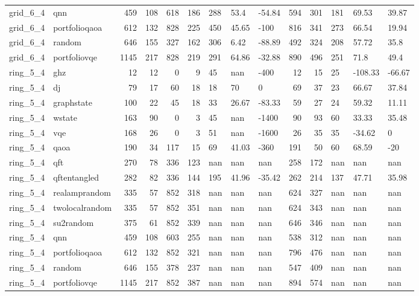 \begin{longtable}{llrrrrlllrrlll}
grid\_6\_4 & qnn & 459 & 108 & 618 & 186 & 288 & 53.4 & -54.84 & 594 & 301 & 181 & 69.53 & 39.87 \\
grid\_6\_4 & portfolioqaoa & 612 & 132 & 828 & 225 & 450 & 45.65 & -100 & 816 & 341 & 273 & 66.54 & 19.94 \\
grid\_6\_4 & random & 646 & 155 & 327 & 162 & 306 & 6.42 & -88.89 & 492 & 324 & 208 & 57.72 & 35.8 \\
grid\_6\_4 & portfoliovqe & 1145 & 217 & 828 & 219 & 291 & 64.86 & -32.88 & 890 & 496 & 251 & 71.8 & 49.4 \\
ring\_5\_4 & ghz & 12 & 12 & 0 & 9 & 45 & nan & -400 & 12 & 15 & 25 & -108.33 & -66.67 \\
ring\_5\_4 & dj & 79 & 17 & 60 & 18 & 18 & 70 & 0 & 69 & 37 & 23 & 66.67 & 37.84 \\
ring\_5\_4 & graphstate & 100 & 22 & 45 & 18 & 33 & 26.67 & -83.33 & 59 & 27 & 24 & 59.32 & 11.11 \\
ring\_5\_4 & wstate & 163 & 90 & 0 & 3 & 45 & nan & -1400 & 90 & 93 & 60 & 33.33 & 35.48 \\
ring\_5\_4 & vqe & 168 & 26 & 0 & 3 & 51 & nan & -1600 & 26 & 35 & 35 & -34.62 & 0 \\
ring\_5\_4 & qaoa & 190 & 34 & 117 & 15 & 69 & 41.03 & -360 & 191 & 50 & 60 & 68.59 & -20 \\
ring\_5\_4 & qft & 270 & 78 & 336 & 123 & nan & nan & nan & 258 & 172 & nan & nan & nan \\
ring\_5\_4 & qftentangled & 282 & 82 & 336 & 144 & 195 & 41.96 & -35.42 & 262 & 214 & 137 & 47.71 & 35.98 \\
ring\_5\_4 & realamprandom & 335 & 57 & 852 & 318 & nan & nan & nan & 624 & 327 & nan & nan & nan \\
ring\_5\_4 & twolocalrandom & 335 & 57 & 852 & 351 & nan & nan & nan & 624 & 343 & nan & nan & nan \\
ring\_5\_4 & su2random & 375 & 61 & 852 & 339 & nan & nan & nan & 646 & 346 & nan & nan & nan \\
ring\_5\_4 & qnn & 459 & 108 & 603 & 255 & nan & nan & nan & 538 & 312 & nan & nan & nan \\
ring\_5\_4 & portfolioqaoa & 612 & 132 & 852 & 321 & nan & nan & nan & 796 & 476 & nan & nan & nan \\
ring\_5\_4 & random & 646 & 155 & 378 & 237 & nan & nan & nan & 547 & 409 & nan & nan & nan \\
ring\_5\_4 & portfoliovqe & 1145 & 217 & 852 & 387 & nan & nan & nan & 894 & 574 & nan & nan & nan \\

\end{longtable}
